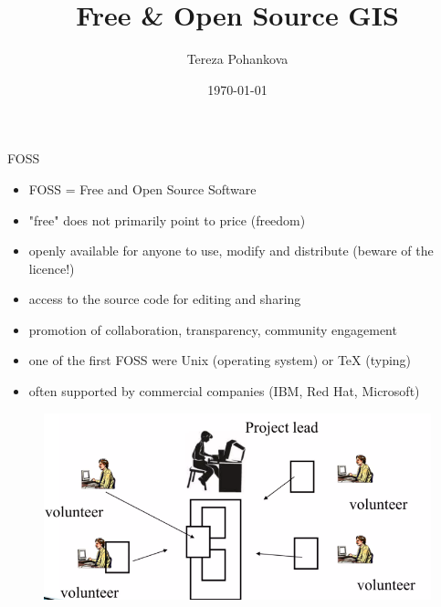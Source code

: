 \documentclass{beamer}
\title{Free \& Open Source GIS}
\date{\today}
\author{Tereza Pohankova}
\institute{Department of Geoinformatics, Palacky University Olomouc}
\begin{document}
     
        \maketitle
        \begin{frame}[allowframebreaks]{FOSS}
            \begin{itemize}
                \item FOSS = Free and Open Source Software
                \item "free" does not primarily point to price (freedom)
                \item openly available for anyone to use, modify and distribute (beware of the licence!)
                \item access to the source code for editing and sharing
                \item promotion of collaboration, transparency, community engagement
                \item one of the first FOSS were Unix (operating system) or TeX (typing)
                \item often supported by commercial companies (IBM, Red Hat, Microsoft)
                
            \end{itemize}

            \begin{figure}
                \includegraphics[scale=0.4]{figs/foss_principle.png}
            \end{figure}


\end{frame}
\end{document}

